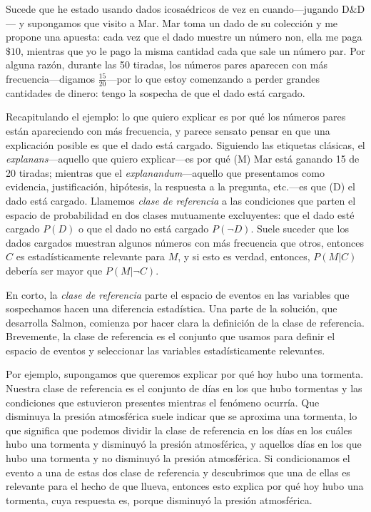 Sucede que he estado usando dados icosaédricos de vez en
cuando---jugando D\&D--- y supongamos que visito a Mar. Mar
toma un dado de su colección y me propone una apuesta: cada
vez que el dado muestre un número non, ella me paga $ \$10
$, mientras que yo le pago la misma cantidad cada que sale
un número par. Por alguna razón, durante las 50 tiradas, los
números pares aparecen con más frecuencia---digamos $
\frac{15}{20} $---por lo que estoy comenzando a perder
grandes cantidades de dinero: tengo la sospecha de que el
dado está cargado.

Recapitulando el ejemplo: lo que quiero explicar es por qué
los números pares están apareciendo con más frecuencia, y
parece sensato pensar en que una explicación posible es que
el dado está cargado. Siguiendo las etiquetas clásicas, el
\emph{explanans}---aquello que quiero explicar---es por qué
(M) Mar está ganando 15 de 20 tiradas; mientras que el 
\emph{explanandum}---aquello que presentamos como evidencia,
justificación, hipótesis, la respuesta a la pregunta, 
etc.---es que (D) el dado está cargado. Llamemos \emph{clase
de referencia} a las condiciones que parten el espacio de
probabilidad en dos clases mutuamente excluyentes: que el
dado esté cargado $P(D) $ o que el dado no está cargado 
$P(\neg D)$. Suele suceder que los dados cargados muestran
algunos números con más frecuencia que otros, entonces $ C $
es estadísticamente relevante para $ M $, y si esto es
verdad, entonces, $ P( M | C ) $ debería ser mayor que $ P(M 
| \neg C ) $.

En corto, la \emph{clase de referencia} parte el espacio de
eventos en las variables que sospechamos hacen una
diferencia estadística. Una parte de la solución, que
desarrolla Salmon, comienza por hacer clara la definición de
la clase de referencia. Brevemente, la clase de referencia
es el conjunto que usamos para definir el espacio de eventos
y seleccionar las variables estadísticamente relevantes.

Por ejemplo, supongamos que queremos explicar por qué hoy
hubo una tormenta. Nuestra clase de referencia es el
conjunto de días en los que hubo tormentas y las condiciones
que estuvieron presentes mientras el fenómeno ocurría. Que
disminuya la presión atmosférica suele indicar que se
aproxima una tormenta, lo que significa que podemos dividir
la clase de referencia en los días en los cuáles hubo una
tormenta y disminuyó la presión atmosférica, y aquellos días
en los que hubo una tormenta y no disminuyó la presión
atmosférica. Si condicionamos el evento a una de estas dos
clase de referencia y descubrimos que una de ellas es
relevante para el hecho de que llueva, entonces esto explica
por qué hoy hubo una tormenta, cuya respuesta es, porque
disminuyó la presión atmosférica.

